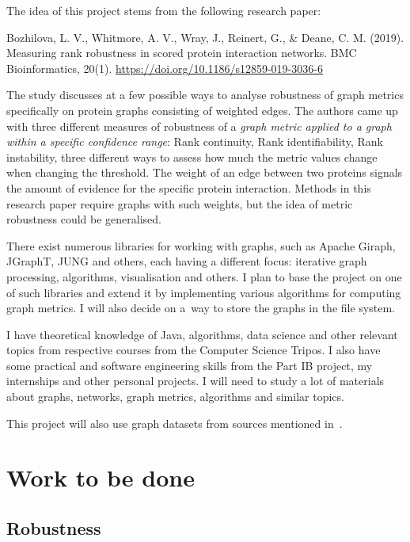 The idea of this project stems from the following research paper:

\begin{adjustwidth}{1cm}{}
    Bozhilova, L. V., Whitmore, A. V., Wray, J., Reinert, G., \& Deane, C. M. (2019). Measuring rank robustness in scored protein interaction networks. BMC Bioinformatics, 20(1). \url{https://doi.org/10.1186/s12859-019-3036-6}
\end{adjustwidth}

The study discusses at a few possible ways to analyse robustness of graph metrics specifically on protein graphs consisting of weighted edges. The authors came up with three different measures of robustness of a \textit{graph metric applied to a graph within a specific confidence range}: Rank continuity, Rank identifiability, Rank instability, three different ways to assess how much the metric values change when changing the threshold. The weight of an edge between two proteins signals the amount of evidence for the specific protein interaction. Methods in this research paper require graphs with such weights, but the idea of metric robustness could be generalised.

There exist numerous libraries for working with graphs, such as Apache Giraph, JGraphT, JUNG and others, each having a different focus: iterative graph processing, algorithms, visualisation and others. I plan to base the project on one of such libraries and extend it by implementing various algorithms for computing graph metrics. I will also decide on a~way to store the graphs in the file system.

I have theoretical knowledge of Java, algorithms, data science and other relevant topics from respective courses from the Computer Science Tripos. I also have some practical and software engineering skills from the Part IB project, my internships and other personal projects. I will need to study a lot of materials about graphs, networks, graph metrics, algorithms and similar topics.

This project will also use graph datasets from sources mentioned in~.

\section*{Work to be done}

\subsection*{Robustness}

